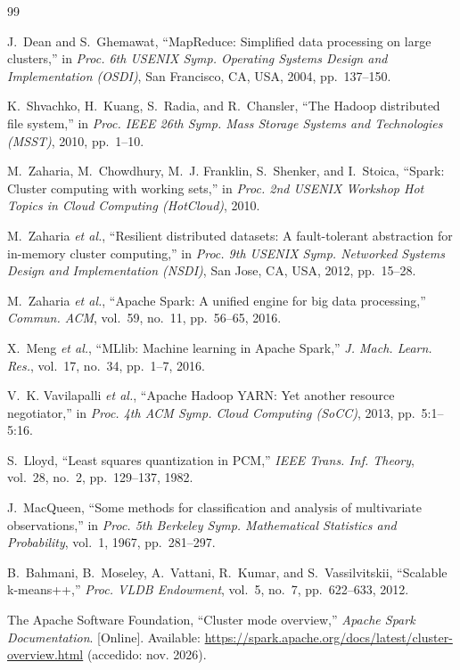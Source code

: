 \documentclass[conference,a4paper]{IEEEtran}
\begin{document}
\begin{thebibliography}{99}

J.~Dean and S.~Ghemawat, ``MapReduce: Simplified data processing on large clusters,'' in \textit{Proc. 6th USENIX Symp. Operating Systems Design and Implementation (OSDI)}, San Francisco, CA, USA, 2004, pp.~137--150.

K.~Shvachko, H.~Kuang, S.~Radia, and R.~Chansler, ``The Hadoop distributed file system,'' in \textit{Proc. IEEE 26th Symp. Mass Storage Systems and Technologies (MSST)}, 2010, pp.~1--10.

M.~Zaharia, M.~Chowdhury, M.~J. Franklin, S.~Shenker, and I.~Stoica, ``Spark: Cluster computing with working sets,'' in \textit{Proc. 2nd USENIX Workshop Hot Topics in Cloud Computing (HotCloud)}, 2010.

M.~Zaharia \textit{et al.}, ``Resilient distributed datasets: A fault-tolerant abstraction for in-memory cluster computing,'' in \textit{Proc. 9th USENIX Symp. Networked Systems Design and Implementation (NSDI)}, San Jose, CA, USA, 2012, pp.~15--28.

M.~Zaharia \textit{et al.}, ``Apache Spark: A unified engine for big data processing,'' \textit{Commun. ACM}, vol.~59, no.~11, pp.~56--65, 2016.

X.~Meng \textit{et al.}, ``MLlib: Machine learning in Apache Spark,'' \textit{J. Mach. Learn. Res.}, vol.~17, no.~34, pp.~1--7, 2016.

V.~K. Vavilapalli \textit{et al.}, ``Apache Hadoop YARN: Yet another resource negotiator,'' in \textit{Proc. 4th ACM Symp. Cloud Computing (SoCC)}, 2013, pp.~5:1--5:16.

S.~Lloyd, ``Least squares quantization in PCM,'' \textit{IEEE Trans. Inf. Theory}, vol.~28, no.~2, pp.~129--137, 1982.

J.~MacQueen, ``Some methods for classification and analysis of multivariate observations,'' in \textit{Proc. 5th Berkeley Symp. Mathematical Statistics and Probability}, vol.~1, 1967, pp.~281--297.

B.~Bahmani, B.~Moseley, A.~Vattani, R.~Kumar, and S.~Vassilvitskii, ``Scalable k-means++,'' \textit{Proc. VLDB Endowment}, vol.~5, no.~7, pp.~622--633, 2012.

The Apache Software Foundation, ``Cluster mode overview,'' \textit{Apache Spark Documentation}. [Online]. Available: \url{https://spark.apache.org/docs/latest/cluster-overview.html} (accedido: nov. 2026).


\end{thebibliography}
\end{document}
